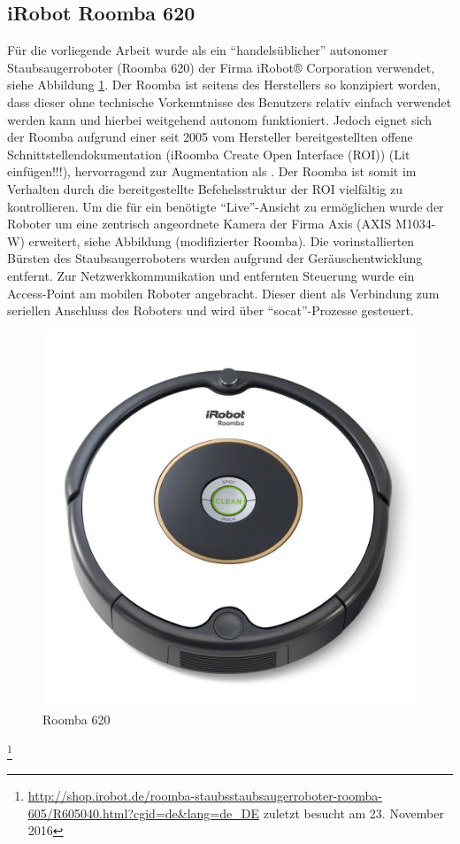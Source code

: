 \subsection{iRobot Roomba 620}
Für die vorliegende Arbeit wurde als \tp ein \enquote{handelsüblicher} autonomer Staubsaugerroboter (Roomba 620) der Firma iRobot® Corporation verwendet, siehe Abbildung \ref{fig:roomba}. Der Roomba ist seitens des Herstellers so konzipiert worden, dass dieser ohne technische Vorkenntnisse des Benutzers relativ einfach verwendet werden kann und hierbei weitgehend autonom funktioniert. Jedoch eignet sich der Roomba aufgrund einer seit 2005 vom Hersteller bereitgestellten offene Schnittstellendokumentation (iRoomba Create Open Interface (ROI)) (Lit einfügen!!!), hervorragend zur Augmentation als \tp. Der Roomba ist somit im Verhalten durch die bereitgestellte Befehelsstruktur der ROI vielfältig zu kontrollieren. Um die für ein \tp benötigte \enquote{Live}-Ansicht zu ermöglichen wurde der Roboter um eine zentrisch angeordnete Kamera der Firma Axis (AXIS M1034-W) erweitert, siehe Abbildung (modifizierter Roomba). Die vorinstallierten Bürsten des Staubsaugerroboters wurden aufgrund der Geräuschentwicklung entfernt. Zur Netzwerkkommunikation und entfernten Steuerung wurde ein Access-Point am mobilen Roboter angebracht. Dieser dient als Verbindung zum seriellen Anschluss des Roboters und wird über \enquote{socat}-Prozesse gesteuert. 


\begin{figure}[ht]
\begin{center}
\includegraphics[scale=0.1]{bilder/implementierung/Roomba.jpg}
\end{center}
\caption{Roomba 620}
\label{fig:roomba}
\end{figure}
\footnote{\url{http://shop.irobot.de/roomba-staubsstaubsaugerroboter-roomba-605/R605040.html?cgid=de&lang=de_DE} zuletzt besucht am 23. November 2016}


